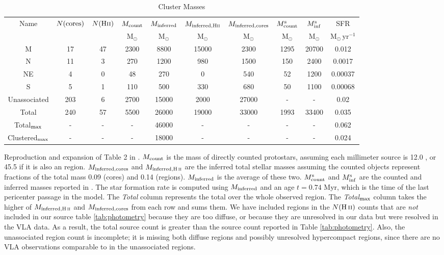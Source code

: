 \begin{table*}[htp]
\centering
\caption{Cluster Masses}
\begin{tabular}{cccccccccc}
\label{tab:clustermassestimates}
Name & $N({\rm cores})$ & $N({\rm H\textsc{ii}})$ & $M_{\rm count}$ & $M_{\rm inferred}$ & $M_{\rm inferred, H\textsc{ii}}$ & $M_{\rm inferred, cores}$ & $M_{\rm count}^{\rm s}$ & $M_{\rm inf}^{\rm s}$ & SFR \\
 &  &  & $\mathrm{M_{\odot}}$ & $\mathrm{M_{\odot}}$ & $\mathrm{M_{\odot}}$ & $\mathrm{M_{\odot}}$ & $\mathrm{M_{\odot}}$ & $\mathrm{M_{\odot}}$ & $\mathrm{M_{\odot}\,yr^{-1}}$ \\
\hline
M & 17 & 47 & 2300 & 8800 & 15000 & 2300 & 1295 & 20700 & 0.012 \\
N & 11 & 3 & 270 & 1200 & 980 & 1500 & 150 & 2400 & 0.0017 \\
NE & 4 & 0 & 48 & 270 & 0 & 540 & 52 & 1200 & 0.00037 \\
S & 5 & 1 & 110 & 500 & 330 & 680 & 50 & 1100 & 0.00068 \\
Unassociated & 203 & 6 & 2700 & 15000 & 2000 & 27000 & - & - & 0.02 \\
Total & 240 & 57 & 5500 & 26000 & 19000 & 33000 & 1993 & 33400 & 0.035 \\
Total$_{\rm max}$ & - & - & - & 46000 & - & - & - & - & 0.062 \\
Clustered$_{\rm max}$ & - & - & - & 18000 & - & - & - & - & 0.024 \\
\hline
\end{tabular}
\par
Reproduction and expansion of Table 2 in \citet{Ginsburg2018a}. $M_{\rm count}$ is the mass of directly counted protostars, assuming each millimeter source is 12.0 \msun, or 45.5 \msun if it is also an \hii region.  $M_{\rm inferred,cores}$ and $M_{\rm inferred,\hii}$ are the inferred total stellar masses assuming the counted objects represent fractions of the total mass 0.09 (cores) and 0.14 (\hii regions).  $M_{\rm inferred}$ is the average of these two.  $M_{\rm count}^{\rm s}$ and $M_{\rm inf}^{\rm s}$ are the counted and inferred masses reported in \citet{Schmiedeke2016a}.  The star formation rate is computed using $M_{\rm inferred}$ and an age $t=0.74$ Myr, which is the time of the last pericenter passage in the \citet{Kruijssen2015a} model.  The \emph{Total} column represents the total over the whole observed region.  The \emph{Total}$_{\rm max}$ column takes the higher of $M_{\rm inferred,\hii}$ and $M_{\rm inferred,cores}$ from each row and sums them.  We have included \hii regions in the $N(\hii)$ counts  that are \emph{not} included in our source table \ref{tab:photometry} because they are too diffuse, or because they are unresolved in our data but were resolved in the \citet{De-Pree2014a} VLA data.  As a result, the total source count is greater than the source count reported in Table \ref{tab:photometry}. Also, the unassociated \hii region count is incomplete; it is missing both diffuse \hii regions and possibly unresolved hypercompact \hii regions, since there are no VLA observations comparable to \citet{De-Pree2014a} in the unassociated regions.
\end{table*}
